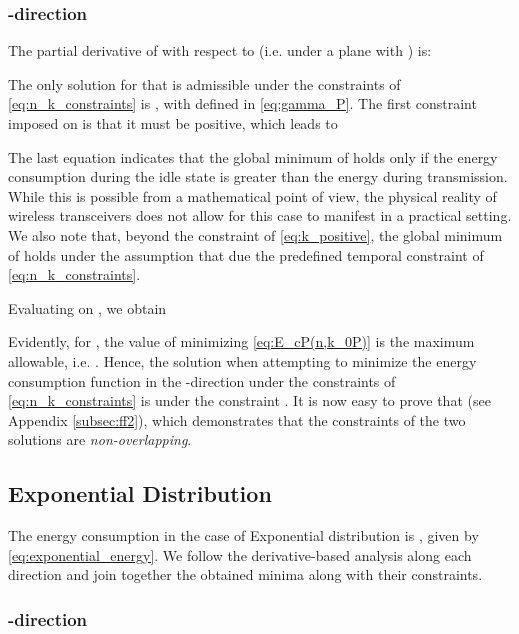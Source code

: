 \documentclass[twocolumn,english]{IEEEtran}
\theoremstyle{plain}
\theoremstyle{definition}
\begin{document}
\subsubsection{-direction}

The partial derivative of  with respect to  (i.e.
under a plane  with )
is:




\noindent \begin{flushleft}
The only solution for 
that is admissible under the constraints of \eqref{eq:n_k_constraints}
is , with 
defined in \eqref{eq:gamma_P}. The first constraint imposed on 
is that it must be positive, which leads to 
\par\end{flushleft}

\noindent 

The last equation indicates that the global minimum of 
holds only if the energy consumption during the idle state is greater
than the energy during transmission. While this is possible from a
mathematical point of view, the physical reality of wireless transceivers
does not allow for this case to manifest in a practical setting. We
also note that, beyond the constraint of \eqref{eq:k_positive}, the
global minimum of  holds under the assumption that
 due the predefined temporal constraint
of \eqref{eq:n_k_constraints}.

\noindent Evaluating  on ,
we obtain




\noindent Evidently, for , the value of  minimizing
\eqref{eq:E_cP(n,k_0P)} is the maximum allowable, i.e. .
Hence, the solution when attempting to minimize the energy consumption
function in the -direction under the constraints of \eqref{eq:n_k_constraints}
is 
under the constraint .
It is now easy to prove that 
(see Appendix \ref{subsec:ff2}), which demonstrates that the constraints
of the two solutions are \emph{non-overlapping}.


\subsection{Exponential Distribution\label{sub:Appendix-Exponential}}

The energy consumption in the case of Exponential distribution is
, given by \eqref{eq:exponential_energy}. We follow
the derivative-based analysis along each direction and join together
the obtained minima along with their constraints.


\subsubsection{-direction}
\end{document}
